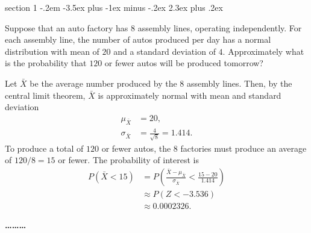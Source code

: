 \documentclass[answers,11pt]{exam}
\makeatletter
\newenvironment{problem}{\@startsection
       {section}
       {1}
       {-.2em}
       {-3.5ex plus -1ex minus -.2ex}
       {2.3ex plus .2ex}
       {\pagebreak[3]%
       \large\bf\noindent{Problem }
       }
       }
       {%
       \begin{center}\large\bf \ldots\ldots\ldots\end{center}}
\makeatother
\begin{document}
\begin{problem}{}

Suppose that an auto factory has $8$ assembly lines, operating
independently.  For each assembly line, the number of autos produced per day
has a normal distribution with mean of $20$ and a standard deviation of $4$. 
Approximately what is the
probability that $120$ or fewer autos will be produced tomorrow?

\begin{solution}
Let $\bar X$ be the average number produced by the $8$ assembly lines.  Then,
by the central limit theorem, $\bar X$ is approximately normal with mean and
standard deviation
\begin{align*}
  \mu_{\bar X} &= 20, \\
  \sigma_{\bar X} &= \frac{4}{\sqrt{8}} = 1.414.
\end{align*}
To produce a total of $120$ or fewer autos, the $8$ factories must produce an
average of $120/8 = 15$ or fewer.  The probability of interest is
\begin{align*}
  P(\bar X < 15)
    &= P\left(\frac{\bar X - \mu_{\bar X}}{\sigma_{\bar X}}
          < \frac{15 - 20}{1.414}\right) \\
    &\approx P(Z < -3.536) \\
    &\approx 0.0002326.
\end{align*}
\end{solution}

\end{problem}
\end{document}
